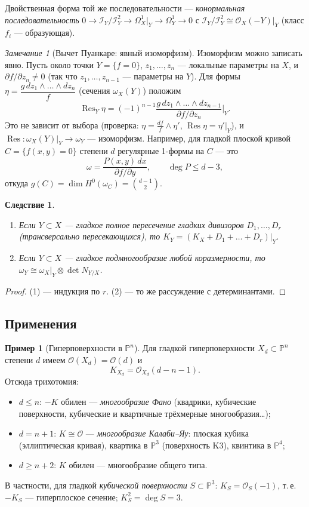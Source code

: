 \documentclass[11pt,a4paper]{article}
\theoremstyle{plain}
\newtheorem{corollary}[theorem]{Следствие}
\theoremstyle{definition}
\newtheorem{example}[theorem]{Пример}
\theoremstyle{remark}
\newtheorem{remark}[theorem]{Замечание}
\newcommand{\PP}{\mathbb{P}}
\newcommand{\cO}{\mathcal{O}}
\newcommand{\cI}{\mathcal{I}}
\DeclareMathOperator{\Res}{Res}
\begin{document}
Двойственная форма той же последовательности --- \emph{конормальная последовательность}
$0\to\cI_Y/\cI_Y^2\to\Omega^1_X|_Y\to\Omega^1_Y\to0$ с $\cI_Y/\cI_Y^2\cong\cO_X(-Y)|_Y$
(класс $f_i$ --- образующая).

\begin{remark}[Вычет Пуанкаре: явный изоморфизм]
Изоморфизм можно записать явно. Пусть около точки $Y=\{f=0\}$, $z_1,\dots,z_n$ --- локальные параметры
на $X$, и $\partial f/\partial z_n\ne0$ (так что $z_1,\dots,z_{n-1}$ --- параметры на $Y$). Для
формы $\eta=\dfrac{g\,dz_1\wedge\dots\wedge dz_n}{f}$ (сечения $\omega_X(Y)$) положим
\[
\Res_Y\eta=(-1)^{n-1}\frac{g\,dz_1\wedge\dots\wedge dz_{n-1}}{\partial f/\partial z_n}\Big|_Y .
\]
Это не зависит от выбора (проверка: $\eta=\frac{df}{f}\wedge\eta'$, $\Res\eta=\eta'|_Y$), и
$\Res\colon\omega_X(Y)|_Y\to\omega_Y$ --- изоморфизм. Например, для гладкой плоской кривой
$C=\{f(x,y)=0\}$ степени $d$ регулярные 1-формы на $C$ --- это
\[
\omega=\frac{P(x,y)\,dx}{\partial f/\partial y},\qquad \deg P\le d-3,
\]
откуда $g(C)=\dim H^0(\omega_C)=\binom{d-1}2$.
\end{remark}

\begin{corollary}\label{cor:adj-general}
\begin{enumerate}
\item Если $Y\subset X$ --- гладкое полное пересечение гладких дивизоров $D_1,\dots,D_r$
(трансверсально пересекающихся), то $K_Y=(K_X+D_1+\dots+D_r)|_Y$.
\item Если $Y\subset X$ --- гладкое подмногообразие любой коразмерности, то
$\omega_Y\cong\omega_X|_Y\otimes\det N_{Y/X}$.
\end{enumerate}
\end{corollary}
\begin{proof}
(1) --- индукция по $r$. (2) --- то же рассуждение с детерминантами.
\end{proof}

\subsection{Применения}

\begin{example}[Гиперповерхности в $\PP^n$]\label{ex:hypersurface}
Для гладкой гиперповерхности $X_d\subset\PP^n$ степени $d$ имеем $\cO(X_d)=\cO(d)$ и
\[
K_{X_d}=\cO_{X_d}(d-n-1).
\]
Отсюда трихотомия:
\begin{itemize}
\item $d\le n$: $-K$ обилен --- \emph{многообразие Фано} (квадрики, кубические поверхности,
кубические и квартичные трёхмерные многообразия\ldots);
\item $d=n+1$: $K\cong\cO$ --- \emph{многообразие Калаби--Яу}: плоская кубика (эллиптическая кривая),
квартика в $\PP^3$ (поверхность K3), квинтика в $\PP^4$;
\item $d\ge n+2$: $K$ обилен --- многообразие общего типа.
\end{itemize}
В частности, для гладкой \emph{кубической поверхности} $S\subset\PP^3$: $K_S=\cO_S(-1)$, т.\,е.
$-K_S$ --- гиперплоское сечение; $K_S^2=\deg S=3$.
\end{example}
\end{document}
